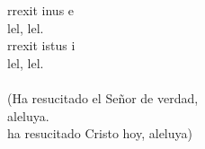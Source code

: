 \begin{cancion}%
	rrexit inus e\\
	lel, lel.\\
	rrexit istus i\\
	lel, lel.\\
	\jump\\
(Ha resucitado el Señor de verdad, \\
aleluya.\\
ha resucitado Cristo hoy, aleluya)\\
\end{cancion}%
